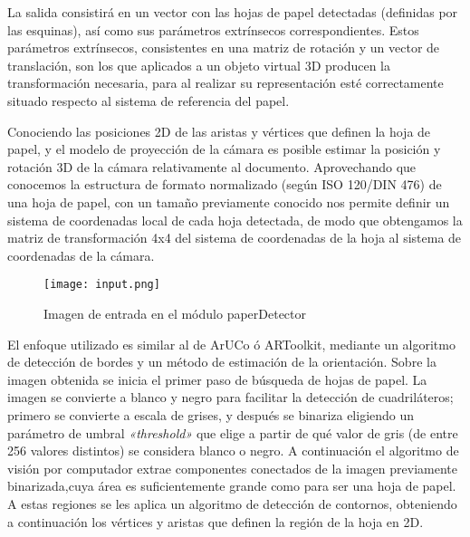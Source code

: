 La salida consistirá en un vector con las hojas de papel detectadas (definidas por las esquinas), así como sus parámetros extrínsecos correspondientes. Estos parámetros extrínsecos, consistentes en una matriz de rotación y un vector de translación, son los que aplicados a un objeto virtual 3D producen la transformación necesaria, para al realizar su representación esté correctamente situado respecto al sistema de referencia del papel.   



Conociendo las posiciones 2D de las aristas y vértices que definen la hoja de papel, y el modelo de proyección de la cámara es posible estimar la posición y rotación 3D de la cámara relativamente al documento. Aprovechando que conocemos la estructura de formato normalizado (según ISO 120/DIN 476) de una hoja de papel, con un tamaño previamente conocido nos permite definir un sistema de coordenadas local de cada hoja detectada, de modo que obtengamos la matriz de transformación 4x4 del sistema de coordenadas de la hoja al sistema de coordenadas de la cámara.

\begin{figure}[h] 
  \centering
  \texttt{[image: input.png]}
  \caption{Imagen de entrada en el módulo paperDetector}
  \label{fig:input}
\end{figure}

El enfoque utilizado es similar al de ArUCo ó ARToolkit, mediante un algoritmo de detección de bordes y un método de estimación de la orientación. Sobre la imagen obtenida se inicia el primer paso de búsqueda de hojas de papel. La imagen se convierte a blanco y negro para facilitar la detección de cuadriláteros; primero se convierte a escala de grises, y después se binariza eligiendo un parámetro de umbral \textit{«threshold»} que elige a partir de qué valor de gris (de entre 256 valores distintos) se considera blanco o negro. A continuación el algoritmo de visión por computador extrae componentes conectados de la imagen previamente binarizada,cuya área es suficientemente grande como para ser una hoja de papel. A estas regiones se les aplica un algoritmo de detección de contornos, obteniendo a continuación los vértices y aristas que definen la región de la hoja en 2D.

